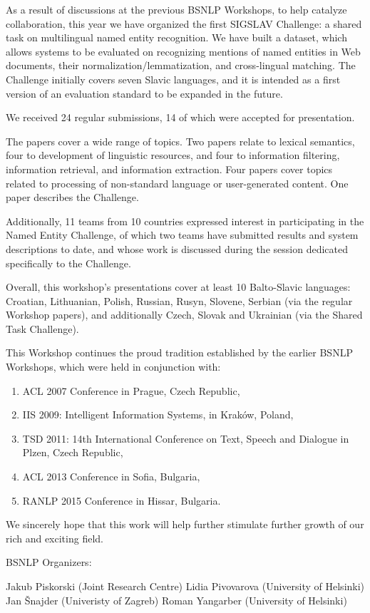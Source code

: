 As a result of discussions at the previous BSNLP Workshops, to help
catalyze collaboration, this year we have organized the first SIGSLAV
Challenge: a shared task on multilingual named entity recognition.  We
have built a dataset, which allows systems to be evaluated on recognizing
mentions of named entities in Web documents, their
normalization/lemmatization, and cross-lingual matching.  The Challenge
initially covers seven Slavic languages, and it is intended as a first
version of an evaluation standard to be expanded in the future.

We received 24 regular submissions, 14 of which were accepted for
presentation.

The papers cover a wide range of topics.  Two papers relate to lexical
semantics, four to development of linguistic resources, and four to
information filtering, information retrieval, and information extraction.
Four papers cover topics related to processing of non-standard language
or user-generated content.
One paper describes the Challenge.

Additionally, 11 teams from 10 countries expressed interest in
participating in the Named Entity Challenge, of which two teams have
submitted results and system descriptions to date, and whose work is
discussed during the session dedicated specifically to the Challenge.

Overall, this workshop's presentations cover at least 10 Balto-Slavic
languages: Croatian, Lithuanian, Polish, Russian, Rusyn, Slovene, Serbian
(via the regular Workshop papers), and additionally Czech, Slovak and
Ukrainian (via the Shared Task Challenge).

This Workshop continues the proud tradition established by the earlier
BSNLP Workshops, which were held in conjunction with:

\begin{enumerate}
\item ACL 2007 Conference in Prague, Czech Republic,
\item IIS 2009: Intelligent Information Systems, in Kraków, Poland,
\item TSD 2011: 14th International Conference on Text, Speech and Dialogue in Plzen, Czech Republic,
\item ACL 2013 Conference in Sofia, Bulgaria,
\item RANLP 2015 Conference in Hissar, Bulgaria.
\end{enumerate}

We sincerely hope that this work will help further stimulate further
growth of our rich and exciting field.

BSNLP Organizers:

Jakub Piskorski (Joint Research Centre)
Lidia Pivovarova (University of Helsinki)
Jan Šnajder (Univeristy of Zagreb)
Roman Yangarber (University of Helsinki)
